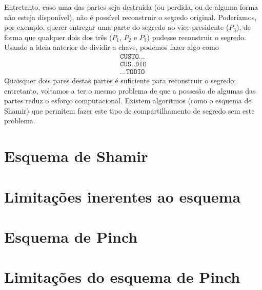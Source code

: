 \documentclass[10pt,twocolumn]{article}
\begin{document}
Entretanto,
caso uma das partes seja destruída
(ou perdida, ou de alguma forma não esteja disponível),
não é possível reconstruir o segredo original.
Poderíamos, por exemplo,
querer entregar uma parte do segredo ao vice-presidente ($P_3$),
de forma que qualquer dois dos três ($P_1$, $P_2$ e $P_3$)
pudesse reconstruir o segredo.
Usando a ideia anterior de dividir a chave,
podemos fazer algo como
\begin{align*}
    \texttt{CUSTO...} \\
    \texttt{CUS..DIO} \\
    \texttt{...TODIO}
\end{align*}
Quaisquer dois pares destas partes é suficiente para reconstruir o segredo;
entretanto,
voltamos a ter o mesmo problema de que a possesão de algumas das partes
reduz o esforço computacional.
Existem algoritmos
(como o esquema de Shamir)
que permitem fazer este tipo de compartilhamento de segredo
sem este problema.

\section{Esquema de Shamir}
\section{Limitações inerentes ao esquema}
\section{Esquema de Pinch}
\section{Limitações do esquema de Pinch}


\end{document}
